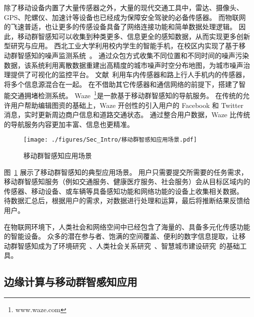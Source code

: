 除了移动设备内置了大量传感器之外，大量的现代交通工具中，雷达、摄像头、GPS、陀螺仪、加速计等设备也已经成为保障安全驾驶的必备传感器。
而物联网的飞速普适，也让更多的传感设备具备了网络连接功能和简单数据处理逻辑。
因此，移动群智感知可以收集到种类更多、信息更全的感知数据，从而实现更多创新型研究与应用。
西北工业大学利用校内学生的智能手机，在校区内实现了基于移动群智感知的噪声监测系统~\cite{CNKI/2014/CSNSYu}。
通过众包方式收集不同位置和不同时间的噪声污染数据，该系统利用离散数据重建出高精度的城市噪声时空分布地图，为城市噪声治理提供了可视化的监控平台。
文献~利用车内传感器和路上行人手机内的传感器，将多个信息源混合在一起。
在不借助其它传感器和通信网络的前提下，搭建了智能交通拥堵检测系统。
Waze~\footnote{www.waze.com}是一款基于移动群智感知的导航服务。
在传统的允许用户帮助编辑图资的基础上，Waze 开创性的引入用户的 Facebook 和 Twitter 消息，实时更新周边商户信息和道路交通状态。
通过整合用户数据，Waze 比传统的导航服务内容更加丰富、信息也更精准。

\begin{figure}[!h]
  \centering
  \texttt{[image: ./figures/Sec\_Intro/移动群智感知应用场景.pdf]}
  \vspace{-0.5em}
  \caption{移动群智感知应用场景}
  \vspace{-1em}
  \label{Figure_MCS_Application}
\end{figure}

图~\ref{Figure_MCS_Application} 展示了移动群智感知的典型应用场景。
用户只需要提交所需要的任务需求，移动群智感知服务（例如交通服务、健康医疗服务、社会服务）会从目标区域内的传感器、移动设备、或车辆等具备感知功能和网络功能的设备上收集相关数据。
待数据汇总后，根据用户的需求，对数据进行处理和运算，最后将推断结果反馈给用户。

在物联网环境下，人类社会和网络空间中已经包含了海量的、具备多元化传感功能的智能设备。
众多的潜在参与者、饱满的空间覆盖、便利的数字信息提取，让移动群智感知成为了环境研究~\cite{DBLP:conf/sensys/DuttaAKMMWW09}、人类社会关系研究~\cite{DBLP:conf/globecom/AslIAM13}、智慧城市建设研究~\cite{DBLP:journals/cm/WangZWCHM16}的基础工具。

\subsection{边缘计算与移动群智感知应用}

